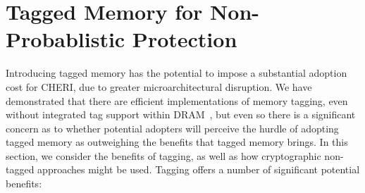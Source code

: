 \section{Tagged Memory for Non-Probablistic Protection}
\label{sec:probablistic_capability_protection}

Introducing tagged memory has the potential to impose a substantial adoption
cost for CHERI, due to greater microarchitectural disruption.
We have demonstrated that there are efficient implementations of memory
tagging, even without integrated tag support within
DRAM~\cite{joannou2017:tagged-memory, UCAM-CL-TR-936}, but even so there is a significant
concern as to whether potential adopters will perceive the hurdle of adopting
tagged memory as outweighing the benefits that tagged memory brings.
In this section, we consider the benefits of tagging, as well as how
cryptographic non-tagged approaches might be used.
Tagging offers a number of significant potential benefits:

